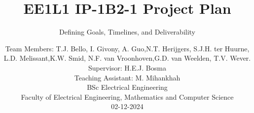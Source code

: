 \documentclass[whitelogo,oneside]{TUD-report2022}
\begin{document}
\frontmatter
\title{\fontsize{40}{40}\selectfont EE1L1 IP-1\newline B2-1 Project Plan}

\subtitle[tudelft-black]{\huge Defining Goals, Timelines, and Deliverability}
\titleoffsetx{2cm}
\titleoffsety{8cm}

\afiloffsetx{1cm}
\afiloffsety{16cm}


\author[tudelft-white]{
\Large{\vspace{10pt}
\selectfont
Team Members: T.J. Bello, I. Givony, A. Guo,\newline N.T. Herijgers, S.J.H. ter Huurne, L.D. Melissant,\newline K.W. Smid, N.F. van Vroonhoven,\newline G.D. van Weelden, T.V. Wever.\\
\vspace{10pt}
Supervisor: H.E.J. Bosma \\
Teaching Assistant: M. Mihankhah \\
\vspace{5pt}
BSc Electrical Engineering \\
Faculty of Electrical Engineering, Mathematics and Computer Science\\
\vspace {10pt}
02-12-2024}}


\makecover

\tableofcontents

\mainmatter









\appendix

%
\newpage
\nocite{alexander-2021}
\nocite{Grit}
\printbibliography
\end{document}
